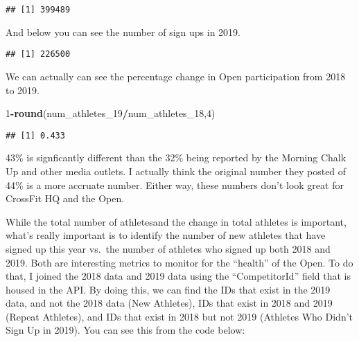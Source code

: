 \documentclass[]{article}
\newenvironment{Shaded}{\begin{snugshade}}{\end{snugshade}}
\newcommand{\KeywordTok}[1]{\textcolor[rgb]{0.13,0.29,0.53}{\textbf{#1}}}
\newcommand{\DecValTok}[1]{\textcolor[rgb]{0.00,0.00,0.81}{#1}}
\newcommand{\StringTok}[1]{\textcolor[rgb]{0.31,0.60,0.02}{#1}}
\newcommand{\OperatorTok}[1]{\textcolor[rgb]{0.81,0.36,0.00}{\textbf{#1}}}
\newcommand{\NormalTok}[1]{#1}
\begin{document}
\begin{Shaded}
\end{Shaded}

\begin{verbatim}
## [1] 399489
\end{verbatim}

And below you can see the number of sign ups in 2019.

\begin{Shaded}
\end{Shaded}

\begin{verbatim}
## [1] 226500
\end{verbatim}

We can actually can see the percentage change in Open participation from
2018 to 2019.

\begin{Shaded}
\begin{Highlighting}[]
\DecValTok{1}\OperatorTok{-}\KeywordTok{round}\NormalTok{(num_athletes_}\DecValTok{19}\OperatorTok{/}\NormalTok{num_athletes_}\DecValTok{18}\NormalTok{,}\DecValTok{4}\NormalTok{)}
\end{Highlighting}
\end{Shaded}

\begin{verbatim}
## [1] 0.433
\end{verbatim}

43\% is signficantly different than the 32\% being reported by the
Morning Chalk Up and other media outlets. I actually think the original
number they posted of 44\% is a more accruate number. Either way, these
numbers don't look great for CrossFit HQ and the Open.

While the total number of athletesand the change in total athletes is
important, what's really important is to identify the number of new
athletes that have signed up this year vs.~the number of athletes who
signed up both 2018 and 2019. Both are interesting metrics to monitor
for the ``health'' of the Open. To do that, I joined the 2018 data and
2019 data using the ``CompetitorId'' field that is housed in the API. By
doing this, we can find the IDs that exist in the 2019 data, and not the
2018 data (New Athletes), IDs that exist in 2018 and 2019 (Repeat
Athletes), and IDs that exist in 2018 but not 2019 (Athletes Who Didn't
Sign Up in 2019). You can see this from the code below:
\end{document}
